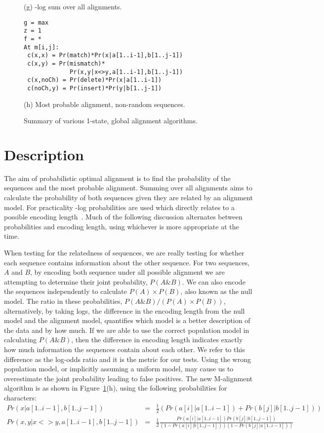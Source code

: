 \documentclass[a4paper,11pt,oneside]{article}
\begin{document}
\begin{figure}
\begin{minipage}{\textwidth}
\begin{multicols}{2}
(g) -log sum over all alignments.


\begin{verbatim}
g = max
z = 1
f = *
At m[i,j]:
 c(x,x) = Pr(match)*Pr(x|a[1..i-1],b[1..j-1])
 c(x,y) = Pr(mismatch)*
             Pr(x,y|x<>y,a[1..i-1],b[1..j-1])
 c(x,noCh) = Pr(delete)*Pr(x|a[1..i-1])
 c(noCh,y) = Pr(insert)*Pr(y|b[1..j-1])
\end{verbatim}

(h) Most probable alignment, non-random sequences.

\end{multicols}
\end{minipage}
\caption{\label{fig:algs}Summary of various 1-state, global alignment algorithms.}
\end{figure}

\section{Description}

The aim of probabilistic optimal alignment is to find the probability of the
sequences and the most probable alignment.  Summing over all alignments aims
to calculate the probability of both sequences given they are related by an
alignment model.  For practicality -log probabilities are used which directly
relates to a possible encoding length~\cite{shannon48}.  Much of the following
discussion alternates between probabilities and encoding length, using
whichever is more appropriate at the time.

When testing for the relatedness of sequences, we are really testing for
whether each sequence contains information about the other sequence.  For two
sequences, $A$ and $B$, by encoding both sequence under all possible alignment
we are attempting to determine their joint probability, $P(A \& B)$.  We can
also encode the sequences independently to calculate $P(A) \times P(B)$, also
known as the null model.  The ratio in these probabilities, $P(A \& B) / (P(A)
\times P(B))$, alternatively, by taking logs, the difference in the encoding
length from the null model and the alignment model, quantifies which model is
a better description of the data and by how much.  If we are able to use the
correct population model in calculating $P(A\&B)$, then the difference in
encoding length indicates exactly how much information the sequences contain
about each other.  We refer to this difference as the log-odds ratio and it is
the metric for our tests. Using the wrong population model, or implicitly
assuming a uniform model, may cause us to overestimate the joint probability
leading to false positives.
\newpage
The new M-alignment algorithm is as shown in Figure~\ref{fig:algs}(h), using
the following probabilities for characters:
\begin{eqnarray*}
Pr(x|a[1..i-1],b[1..j-1]) & = & \frac{1}{2} ( Pr(a[i]|a[1..i-1]) +
Pr(b[j]|b[1..j-1]) ) \\
Pr(x,y|x<>y,a[1..i-1],b[1..j-1]) & = & \frac{1}{2}\frac{Pr(a[i]|a[1..i-1])
Pr(b[j]|b[1..j-1])}{(1-Pr(a[i]|b[1..j-1]))(1-Pr(b[j]|a[1..i-1]))}
\end{eqnarray*}
\end{document}
